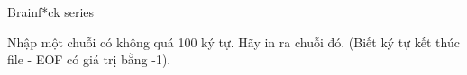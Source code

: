 Brainf*ck series     

   Nhập một chuỗi có không quá 100 ký tự. Hãy in ra chuỗi đó. (Biết ký tự kết thúc file - EOF có giá trị bằng -1).  

\